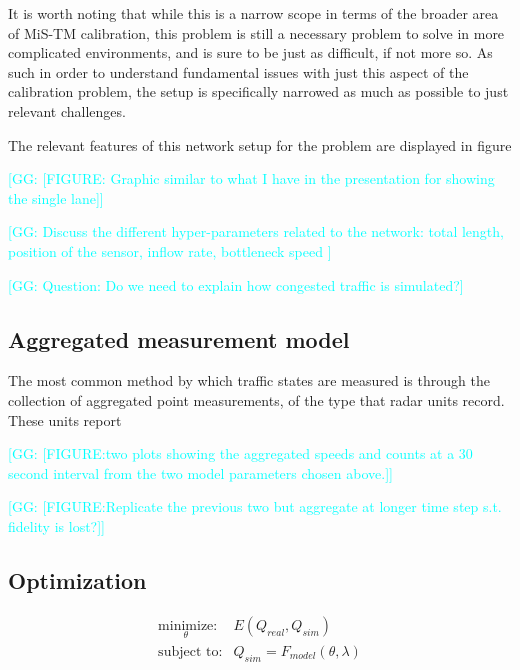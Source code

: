 \documentclass[english,titlepage,oneside,12pt]{article}
\newcommand{\kibitz}[2]{\ifnum\Comments=1\textcolor{#1}{#2}\fi}
\newcommand{\George}[1]{\kibitz{cyan}      {[GG: #1]}}
\begin{document}
It is worth noting that while this is a narrow scope in terms of the broader area of MiS-TM calibration, this problem is still a necessary problem to solve in more complicated environments, and is sure to be just as difficult, if not more so. As such in order to understand fundamental issues with just this aspect of the calibration problem, the setup is specifically narrowed as much as possible to just relevant challenges.

The relevant features of this network setup for the problem are displayed in figure 

\George{[FIGURE: Graphic similar to what I have in the presentation for showing the single lane]}

\George{Discuss the different hyper-parameters related to the network: total length, position of the sensor, inflow rate, bottleneck speed }

\George{Question: Do we need to explain how congested traffic is simulated?}

\subsection{Aggregated measurement model}
The most common method by which traffic states are measured is through the collection of aggregated point measurements, of the type that radar units record. These units report

\George{[FIGURE:two plots showing the aggregated speeds and counts at a 30 second interval from the two model parameters chosen above.]}

\George{[FIGURE:Replicate the previous two but aggregate at longer time step s.t. fidelity is lost?]}


\subsection{Optimization}

\begin{equation}\label{eq:Calibration_Optimization_Problem}
\begin{array}{rl}
\underset{\theta}
{{\text{minimize}}}: & E(Q_{real},Q_{sim})\\
\text{subject to:}
 & Q_{sim} = F_{model}(\theta,\lambda)
\end{array}
\end{equation}



\end{document}
